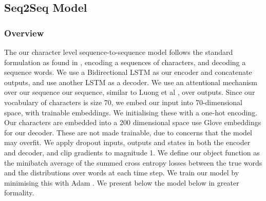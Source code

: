 








\subsection{Seq2Seq Model} %
\label{sec:character_level_sequence_to_sequence}

\subsubsection{Overview}

The our character level sequence-to-sequence model follows the standard formulation as found in \cite{sutskever_sequence_2014} \cite{bahdanau_neural_2014}, encoding a sequences of characters, and decoding a sequence words. 
We use a Bidirectional LSTM as our encoder and concatenate outputs, and use another LSTM as a decoder.
We use an attentional mechanism over our sequence our sequence, similar to Luong et al \cite{luong_effective_2015}, over outputs.
Since our vocabulary of characters is size 70, we embed our input into 70-dimensional space, with trainable embeddings. We initialising these with a one-hot encoding.
Our characters are embedded into a 200 dimensional space use Glove embeddings for our decoder. 
These are not made trainable, due to concerns that the model may overfit. 
We apply dropout inputs, outputs and states in both the encoder and decoder, and clip gradients to magnitude 1. 
We define our object function as the minibatch average of the summed cross entropy losses between the true words and the distributions over words at each time step.
We train our model by minimising this with Adam \cite{kingma2014adam}. We present below the model below in greater formality.

